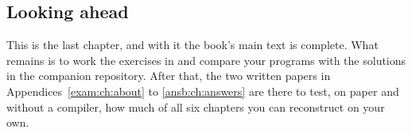 \subsection*{Looking ahead}
This is the last chapter, and with it the book's main text is complete. What remains is to work
the exercises in  and compare your programs with the solutions in the
companion repository. After that, the two written papers in
Appendices~\ref{exam:ch:about} to \ref{ansb:ch:answers} are there to test, on paper and without
a compiler, how much of all six chapters you can reconstruct on your own.
